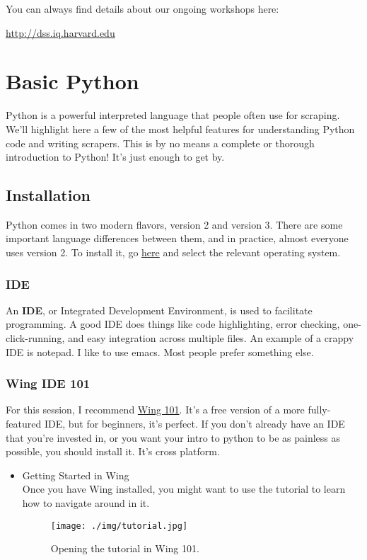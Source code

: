 \documentclass[11pt]{article}
\begin{document}
You can always find details about our ongoing workshops here:

\href{http://dss.iq.harvard.edu}{http://dss.iq.harvard.edu}
\section{Basic Python}
\label{sec-2}

Python is a powerful interpreted language that people often use for
scraping.  We'll highlight here a few of the most helpful features for
understanding Python code and writing scrapers.  This is by no means a
complete or thorough introduction to Python!  It's just enough to get
by.
\subsection{Installation}
\label{sec-2-1}

   Python comes in two modern flavors, version 2 and version 3.  There
   are some important language differences between them, and in
   practice, almost everyone uses version 2.  To install it, go \href{http://python.org/download/}{here}
   and select the relevant operating system.
\subsubsection{IDE}
\label{sec-2-1-1}

   An \textbf{IDE}, or Integrated Development Environment, is used to
   facilitate programming.  A good IDE does things like code
   highlighting, error checking, one-click-running, and easy
   integration across multiple files.  An example of a crappy IDE is
   notepad.  I like to use emacs.  Most people prefer something else.
\subsubsection{Wing IDE 101}
\label{sec-2-1-2}

    For this session, I recommend \href{http://wingware.com/downloads/wingide-101}{Wing 101}.  It's a free version of a
    more fully-featured IDE, but for beginners, it's perfect.  If you
    don't already have an IDE that you're invested in, or you want
    your intro to python to be as painless as possible, you should
    install it.  It's cross platform.
\begin{itemize}

\item Getting Started in Wing\\
\label{sec-2-1-2-1}%
Once you have Wing installed, you might want to use the tutorial
     to learn how to navigate around in it.

     \begin{figure}[htb]
     \centering
     \texttt{[image: ./img/tutorial.jpg]}
     \caption{Opening the tutorial in Wing 101.}
     \end{figure}

\end{itemize} %
\end{document}
